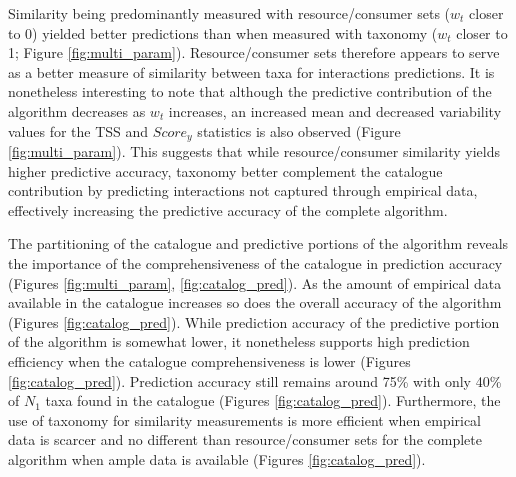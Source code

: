 Similarity being predominantly measured with resource/consumer sets ($w_t$ closer to 0) yielded better predictions than when measured with taxonomy ($w_t$ closer to 1; Figure \ref{fig:multi_param}). Resource/consumer sets therefore appears to serve as a better measure of similarity between taxa for interactions predictions. It is nonetheless interesting to note that although the predictive contribution of the algorithm decreases as $w_t$ increases, an increased mean and decreased variability values for the TSS and $Score_y$ statistics is also observed (Figure \ref{fig:multi_param}). This suggests that while resource/consumer similarity yields higher predictive accuracy, taxonomy better complement the catalogue contribution by predicting interactions not captured through empirical data, effectively increasing the predictive accuracy of the complete algorithm.

The partitioning of the catalogue and predictive portions of the algorithm reveals the importance of the comprehensiveness of the catalogue in prediction accuracy (Figures \ref{fig:multi_param}, \ref{fig:catalog_pred}). As the amount of empirical data available in the catalogue increases so does the overall accuracy of the algorithm (Figures \ref{fig:catalog_pred}). While prediction accuracy of the predictive portion of the algorithm is somewhat lower, it nonetheless supports high prediction efficiency when the catalogue comprehensiveness is lower (Figures \ref{fig:catalog_pred}). Prediction accuracy still remains around 75\% with only 40\% of $N_1$ taxa found in the catalogue (Figures \ref{fig:catalog_pred}). Furthermore, the use of taxonomy for similarity measurements is more efficient when empirical data is scarcer and no different than resource/consumer sets for the complete algorithm when ample data is available (Figures \ref{fig:catalog_pred}).


